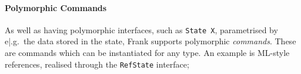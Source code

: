 \documentclass[msc,deptreport,cs]{infthesis} %
\newcommand{\code}[1]{\lstinline{#1}}
\newcommand{\todo}[1]
           {{\par\noindent\small\color{RoyalPurple}
  \framebox{\parbox{\dimexpr\linewidth-2\fboxsep-2\fboxrule}
    {\textbf{TODO:} #1}}}}
\begin{document}



 


\paragraph*{Polymorphic Commands}

As well as having polymorphic interfaces, such as \code{State X}, parametrised
by e|.g.~the data stored in the state, Frank supports polymorphic
\emph{commands}. These are commands which can be instantiated for any type. An
example is ML-style references, realised through the \code{RefState} interface;
\end{document}
